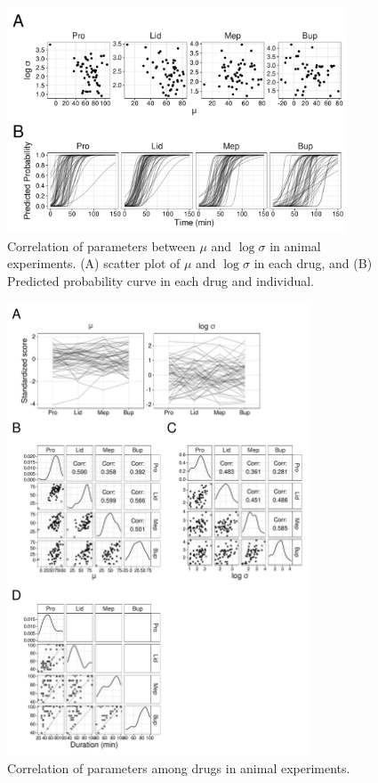 \documentclass[a4paper,11pt]{article}
\begin{document}
\begin{figure}[htbp]
 \centering
 \includegraphics[width=0.9\textwidth]{Fig/Fig1.pdf}
 \caption{Correlation of parameters between $\mu$ and $\log \sigma$
  in animal experiments.
  (A) scatter plot of $\mu$ and $\log \sigma$ in each drug,
  and
  (B) Predicted probability curve in each drug and individual.}
 \label{fig1}
\end{figure}

\clearpage


\begin{figure}[htbp]
 \centering
 \includegraphics[width=0.8\textwidth]{Fig/Fig2.pdf}
 \caption{Correlation of parameters among drugs in animal experiments.}
 \label{fig2}
\end{figure}
\end{document}

